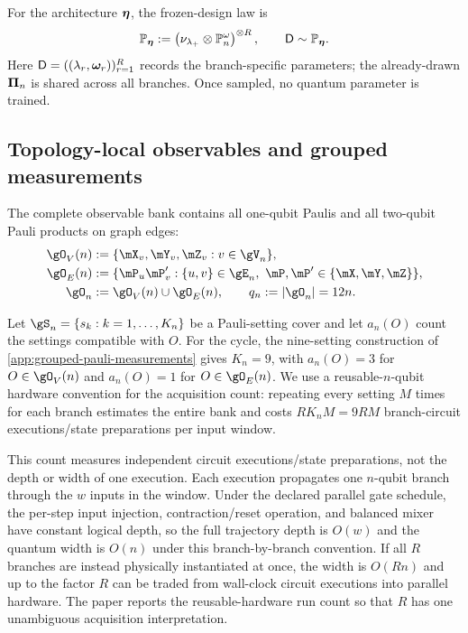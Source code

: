 For the architecture $\bm{\eta}$, the frozen-design law is
\begin{equation}
    \mathbb P_{\bm{\eta}}
    :=\left(\nu_{\lambda_+}\otimes\mathbb P_n^\omega\right)^{\otimes R},
    \qquad \mathsf D\sim\mathbb P_{\bm{\eta}}.
    \label{eq:design-law}
\end{equation}
Here $\mathsf D=((\lambda_r,\boldsymbol{\omega}_r))_{r=1}^R$ records the branch-specific
parameters; the already-drawn $\bm{\Pi}_n$ is shared across all branches.
Once sampled, no quantum parameter is trained.

\subsection{Topology-local observables and grouped measurements}
\label{sec:topology-observables}

The complete observable bank contains all one-qubit Paulis and all two-qubit
Pauli products on graph edges:
\begin{equation}
\begin{aligned}
    \gO_V(n)&:=\{\pauliX_v,\pauliY_v,\pauliZ_v:v\in\gV_n\},\\
    \gO_E(n)&:=\{\mP_u\mP'_v:\{u,v\}\in\gE_n,
       \ \mP,\mP'\in\{\pauliX,\pauliY,\pauliZ\}\},\\
    \gO_n&:=\gO_V(n)\cup\gO_E(n),
    \qquad q_n:=|\gO_n|=12n.
\end{aligned}
    \label{eq:topology-observable-bank}
\end{equation}

Let $\gS_n=\{s_k:k=1,\ldots,K_n\}$ be a Pauli-setting cover and let
$a_n(O)$ count the settings compatible with $O$.  For the cycle, the
nine-setting construction of \cref{app:grouped-pauli-measurements} gives
$K_n=9$, with $a_n(O)=3$ for $O\in\gO_V(n)$ and $a_n(O)=1$ for
$O\in\gO_E(n)$.  We use a reusable-$n$-qubit hardware convention for the
acquisition count: repeating every setting $M$ times for each branch estimates
the entire bank and costs $RK_nM=9RM$ branch-circuit executions/state
preparations per input window.

This count measures independent circuit executions/state preparations, not
the depth or width of one execution.  Each execution propagates one $n$-qubit
branch through the $w$ inputs in the window.  Under the declared parallel gate
schedule, the per-step input injection, contraction/reset operation, and
balanced mixer have constant logical depth, so the full trajectory depth is
$O(w)$ and the quantum width is $O(n)$ under this branch-by-branch convention.
If all $R$ branches are instead physically instantiated at once, the width is
$O(Rn)$ and up to the factor $R$ can be traded from wall-clock circuit
executions into parallel hardware.  The paper reports the reusable-hardware
run count so that $R$ has one unambiguous acquisition interpretation.

